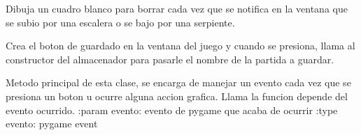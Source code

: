 \documentclass[letterpaper,10pt,english]{sphinxmanual}
\begin{document}
\begin{fulllineitems}
\begin{fulllineitems}
\end{fulllineitems}


\begin{fulllineitems}
\label{\detokenize{codigo:vista.Vista.dibuje_cuadro_blanco}}
Dibuja un cuadro blanco para borrar cada vez que se notifica
en la ventana que se subio por una escalera o se bajo por una
serpiente.

\end{fulllineitems}


\begin{fulllineitems}
\label{\detokenize{codigo:vista.Vista.guardarPartida}}
Crea el boton de guardado en la ventana del juego y cuando se 
presiona, llama al constructor del almacenador para pasarle el
nombre de la partida a guardar.

\end{fulllineitems}


\begin{fulllineitems}
\label{\detokenize{codigo:vista.Vista.notify}}
Metodo principal de esta clase, se encarga de manejar un evento cada vez que se presiona 
un boton u ocurre alguna accion grafica. Llama la funcion depende del evento ocurrido.
:param evento: evento de pygame que acaba de ocurrir
:type evento: pygame event

\end{fulllineitems}


\end{fulllineitems}



\section{}
\label{\detokenize{tutorial:tutorial-acerca-como-jugar-escaleras-y-serpientes}}\label{\detokenize{tutorial::doc}}
\end{document}
